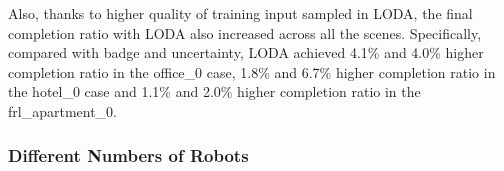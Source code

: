 Also, thanks to higher quality of training input sampled in LODA, the final completion ratio with LODA also increased across all the scenes.
Specifically, compared with badge and uncertainty, LODA achieved 4.1\% and 4.0\% higher completion ratio in the office\_0 case, 1.8\% and 6.7\% higher completion ratio in the hotel\_0 case and 1.1\% and 2.0\% higher completion ratio in the frl\_apartment\_0.


\subsubsection{Different Numbers of Robots}

